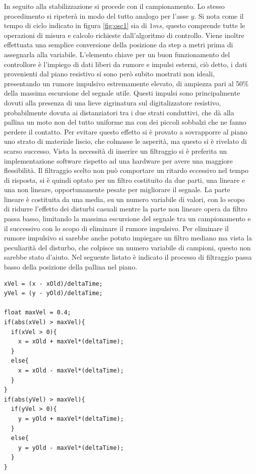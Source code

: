 \documentclass[12pt,twoside,openright]{report}
\begin{document}
In seguito alla stabilizzazione si procede con il campionamento. Lo stesso procedimento si ripeterà in modo del tutto analogo per l'asse $y$. Si nota come il tempo di ciclo indicato in figura \ref{fig:osc1} sia di $1 ms$, questo comprende tutte le operazioni di misura e calcolo richieste dall'algoritmo di controllo. Viene inoltre effettuata una semplice conversione della posizione da step a metri prima di assegnarla alla variabile. L'elemento chiave per un buon funzionamento del controllore è l'impiego di dati liberi da rumore e impulsi esterni, ciò detto, i dati provenienti dal piano resistivo si sono però subito mostrati non ideali, presentando un rumore impulsivo estremamente elevato, di ampiezza pari al 50\% della massima escursione del segnale utile. Questi impulsi sono principalmente dovuti alla presenza di una lieve zigrinatura sul digitalizzatore resistivo, probabilmente dovuta ai distanziatori tra i due strati conduttivi, che dà alla pallina un moto non del tutto uniforme ma con dei piccoli sobbalzi che ne fanno perdere il contatto. Per evitare questo effetto si è provato a sovrapporre al piano uno strato di materiale liscio, che colmasse le asperità, ma questo si è rivelato di scarso successo. Vista la necessità di inserire un filtraggio si è preferita un implementazione software rispetto ad una hardware per avere una maggiore flessibilità. Il filtraggio scelto non può comportare un ritardo eccessivo nel tempo di risposta, si è quindi optato per un filtro costituito da due parti, una lineare e una non lineare, opportunamente pesate per migliorare il segnale. La parte lineare è costituita da una media, su un numero variabile di valori, con lo scopo di ridurre l'effetto dei disturbi casuali mentre la parte non lineare opera da filtro passa basso, limitando la massima escursione del segnale tra un campionamento e il successivo con lo scopo di eliminare il rumore impulsivo. Per eliminare il rumore impulsivo si sarebbe anche potuto impiegare un filtro mediano ma vista la peculiarità del disturbo, che colpisce un numero variabile di campioni, questo non sarebbe stato d'aiuto. Nel seguente listato è indicato il processo di filtraggio passa basso della posizione della pallina nel piano.
\begin{verbatim}
xVel = (x - xOld)/deltaTime;
yVel = (y - yOld)/deltaTime;

float maxVel = 0.4;
if(abs(xVel) > maxVel){
  if(xVel > 0){
    x = xOld + maxVel*(deltaTime);
  }
  else{
    x = xOld - maxVel*(deltaTime);
  }
}
if(abs(yVel) > maxVel){
  if(yVel > 0){
    y = yOld + maxVel*(deltaTime);
  }
  else{
    y = yOld - maxVel*(deltaTime);
  }
}
\end{verbatim}
\end{document}
